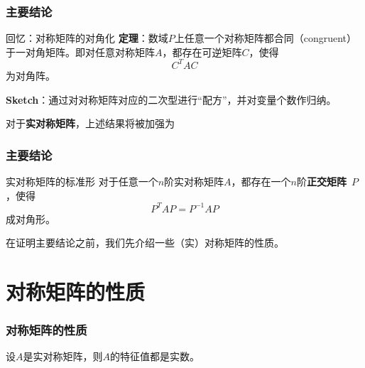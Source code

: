 
\begin{frame}
\frametitle{主要结论}

\begin{block}{回忆：对称矩阵的对角化}
{\bfseries 定理}：数域$P$上任意一个对称矩阵都合同（congruent）于一对角矩阵。即对任意对称矩阵$A$，都存在可逆矩阵$C$，使得
$$C^TAC$$
为对角阵。

\vspace{1em}
\pause

{\bfseries Sketch}：通过对对称矩阵对应的二次型进行``配方''，并对变量个数作归纳。
\end{block}

\vspace{1em}
\pause

对于{\bfseries 实对称矩阵}，上述结果将被加强为

\end{frame}


\begin{frame}
\frametitle{主要结论}

\begin{block}{实对称矩阵的标准形}
对于任意一个$n$阶实对称矩阵$A$，都存在一个$n$阶{\bfseries 正交矩阵}~$P$，使得
$$P^TAP = P^{-1}AP$$
成对角形。
\end{block}

\vspace{1em}
\pause

在证明主要结论之前，我们先介绍一些（实）对称矩阵的性质。

\end{frame}


\section{对称矩阵的性质}


\begin{frame}
\frametitle{对称矩阵的性质}

\begin{lem}
设$A$是实对称矩阵，则$A$的特征值都是实数。
\end{lem}

\end{frame}

